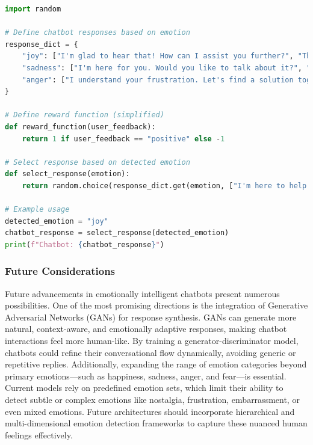 \documentclass[a4paper,10pt]{article}
\begin{document}
\begin{lstlisting}[language=Python, caption=Reinforcement Learning-Based Chatbot, label=lst:rl_chatbot]
import random

# Define chatbot responses based on emotion
response_dict = {
    "joy": ["I'm glad to hear that! How can I assist you further?", "That's wonderful! What would you like to discuss?"],
    "sadness": ["I'm here for you. Would you like to talk about it?", "I'm sorry you're feeling this way. Can I help?"],
    "anger": ["I understand your frustration. Let's find a solution together.", "I'm here to help. What can I do to make things better?"]
}

# Define reward function (simplified)
def reward_function(user_feedback):
    return 1 if user_feedback == "positive" else -1

# Select response based on detected emotion
def select_response(emotion):
    return random.choice(response_dict.get(emotion, ["I'm here to help!"]))

# Example usage
detected_emotion = "joy"
chatbot_response = select_response(detected_emotion)
print(f"Chatbot: {chatbot_response}")
\end{lstlisting}

\subsubsection{Future Considerations}

\noindent Future advancements in emotionally intelligent chatbots present numerous possibilities. One of the most promising directions is the integration of Generative Adversarial Networks (GANs) for response synthesis. GANs can generate more natural, context-aware, and emotionally adaptive responses, making chatbot interactions feel more human-like. By training a generator-discriminator model, chatbots could refine their conversational flow dynamically, avoiding generic or repetitive replies. Additionally, expanding the range of emotion categories beyond primary emotions—such as happiness, sadness, anger, and fear—is essential. Current models rely on predefined emotion sets, which limit their ability to detect subtle or complex emotions like nostalgia, frustration, embarrassment, or even mixed emotions. Future architectures should incorporate hierarchical and multi-dimensional emotion detection frameworks to capture these nuanced human feelings effectively.

\vspace{\baselineskip}
\vspace{\baselineskip}
\end{document}
